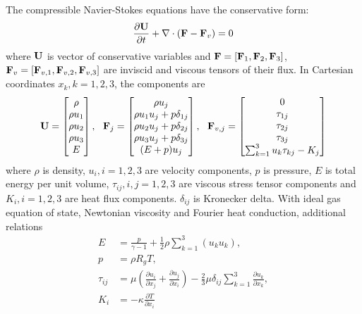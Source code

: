 The compressible Navier-Stokes equations have the conservative form:
\begin{equation}
    \label{eq:NS}
    \frac{\partial \mathbf{U}}{\partial t} +
    \mathbf\nabla \cdot (\mathbf{F} - \mathbf{F}_v)  = 0
\end{equation}
where $\mathbf{U}$ is vector of conservative variables and
$\mathbf{F}=[\mathbf{F}_1,\mathbf{F}_2,\mathbf{F}_3]$,
$\mathbf{F}_v=[\mathbf{F}_{v,1},\mathbf{F}_{v,2},\mathbf{F}_{v,3}]$
are
inviscid and viscous tensors of
their flux.
In Cartesian coordinates $x_k, k=1,2,3$, the components are
\begin{equation}
    \mathbf{U} = \begin{bmatrix}
        \rho \\ \rho u_1 \\ \rho u_2 \\ \rho u_3 \\ E
    \end{bmatrix},\ \
    \mathbf{F}_j = \begin{bmatrix}
        \rho u_j                   \\
        \rho u_1u_j + p\delta_{1j} \\
        \rho u_2u_j + p\delta_{2j} \\
        \rho u_3u_j + p\delta_{3j} \\
        (E+p)u_j                   \\
    \end{bmatrix},\ \
    \mathbf{F}_{v,j} = \begin{bmatrix}
        0                                \\
        \tau_{1j}                        \\
        \tau_{2j}                        \\
        \tau_{3j}                        \\
        \sum_{k=1}^3{u_k\tau_{kj}} - K_j \\
    \end{bmatrix}
\end{equation}
where $\rho$ is density,
$u_i, i=1,2,3$ are velocity components,
$p$ is pressure,
$E$ is total energy per unit volume,
$\tau_{ij}, i,j=1,2,3$ are viscous stress tensor components
and
$K_i, i=1,2,3$ are heat flux components.
$\delta_{ij}$ is
Kronecker delta.
With ideal gas equation of state,
Newtonian viscosity and Fourier
heat conduction, additional relations
\begin{equation}
    \begin{aligned}
        E         & = \frac{p}{\gamma -1 } + \frac{1}{2}\rho\sum_{k=1}^{3}(u_ku_k),  \\
        p         & =\rho R_g T                                              ,       \\
        \tau_{ij} & =
        \mu\left(\frac{\partial u_i}{\partial x_j} + \frac{\partial u_j}{\partial x_i}\right)
        -
        \frac{2}{3}\mu \delta_{ij}\sum_{k=1}^{3}{\frac{\partial u_k}{\partial x_k}}, \\
        K_i       & = - \kappa \frac{\partial T}{\partial x_i}
    \end{aligned}
\end{equation}
